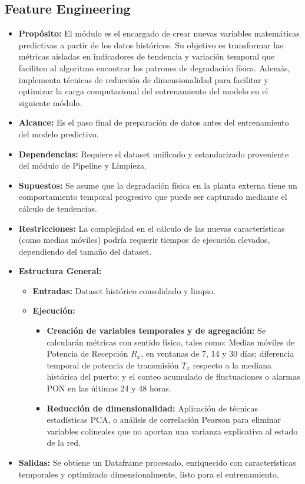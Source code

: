 \documentclass[12pt,a4paper]{article}
\begin{document}
    \subsection{Feature Engineering}
    \begin{itemize}
        \item \textbf{Propósito:} El módulo es el encargado de crear nuevas variables matemáticas predictivas a partir de los datos históricos. Su objetivo es transformar las métricas aisladas
        en indicadores de tendencia y variación temporal que faciliten al algoritmo encontrar los patrones de degradación física. Además, implementa técnicas de reducción de dimensionalidad para facilitar y optimizar la carga computacional del entrenamiento del
        modelo en el siguiente módulo.
        \item \textbf{Alcance:} Es el paso final de preparación de datos antes del entrenamiento del modelo predictivo.
        \item \textbf{Dependencias:} Requiere el dataset unificado y estandarizado proveniente del módulo de Pipeline y Limpieza.
        \item \textbf{Supuestos:} Se asume que la degradación física en la planta externa tiene un comportamiento temporal progresivo que puede ser capturado mediante el cálculo de tendencias.
        \item \textbf{Restricciones:} La complejidad en el cálculo de las nuevas características (como medias móviles) podría requerir tiempos de ejecución elevados, dependiendo del tamaño del dataset.
        \item \textbf{Estructura General:}
        \begin{itemize}
            \item \textbf{Entradas:} Dataset histórico consolidado y limpio.
            \item \textbf{Ejecución:}
             \begin{itemize}
                \item \textbf{Creación de variables temporales y de agregación:} Se calcularán métricas con sentido físico, tales como: Medias móviles de Potencia de Recepción $R_x$, en ventanas de 7, 14 y 30 días; diferencia temporal de potencia de transmisión $T_x$ respecto a la mediana histórica
                 del puerto; y el conteo acumulado de fluctuaciones o alarmas PON en las últimas 24 y 48 horas.
                \item \textbf{Reducción de dimensionalidad:} Aplicación de técnicas estadísticas PCA, o análisis de correlación Pearson para eliminar variables colineales que no aportan una varianza
                explicativa al estado de la red.
            \end{itemize}
        \end{itemize}
        \item \textbf{Salidas:} Se obtiene un Dataframe procesado, enriquecido con características temporales y optimizado dimensionalmente, listo para el entrenamiento. 
    \end{itemize}
\end{document}
